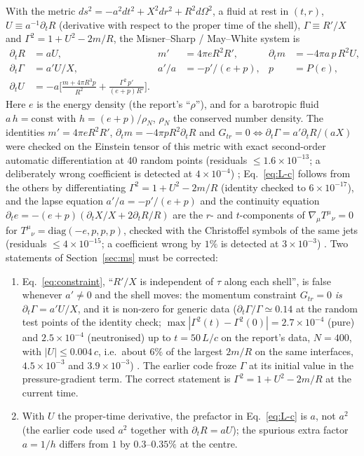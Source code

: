 \documentclass[11pt]{article}
\begin{document}
With the metric $ds^2=-a^2dt^2+X^2dr^2+R^2d\Omega^2$, a fluid at rest in $(t,r)$, $U\equiv a^{-1}\partial_tR$ (derivative with respect to the proper time of the shell), $\Gamma\equiv R'/X$ and $\Gamma^2=1+U^2-2m/R$, the Misner--Sharp \citep{MisnerSharp1964} / May--White \citep{MayWhite1966} system is
\begin{align}
\partial_t R&=aU, & m'&=4\pi e R^2R', & \partial_t m&=-4\pi a\,p\,R^2U, \label{eq:L-a}\\
\partial_t\Gamma&=a'U/X, & a'/a&=-p'/(e+p), & p&=P(e), \label{eq:L-b}\\
\partial_tU&=-a\Big[\frac{m+4\pi R^3p}{R^2}+\frac{\Gamma^2\,p'}{(e+p)R'}\Big]. \label{eq:L-c}
\end{align}
Here $e$ is the energy density (the report's ``$\rho$''), and for a barotropic fluid $a\,h=\mathrm{const}$ with $h=(e+p)/\rho_N$, $\rho_N$ the conserved number density.  The identities $m'=4\pi eR^2R'$, $\partial_tm=-4\pi pR^2\partial_tR$ and $G_{tr}=0\Leftrightarrow\partial_t\Gamma=a'\partial_tR/(aX)$ were checked on the Einstein tensor of this metric with exact second-order automatic differentiation at 40 random points (residuals $\le1.6\times10^{-13}$; a deliberately wrong coefficient is detected at $4\times10^{-4}$) \LP; Eq.~\eqref{eq:L-c} follows from the others by differentiating $\Gamma^2=1+U^2-2m/R$ (identity checked to $6\times10^{-17}$), and the lapse equation $a'/a=-p'/(e+p)$ and the continuity equation $\partial_te=-(e+p)(\partial_tX/X+2\partial_tR/R)$ are the $r$- and $t$-components of $\nabla_\mu T^{\mu}{}_{\nu}=0$ for $T^\mu{}_\nu=\mathrm{diag}(-e,p,p,p)$, checked with the Christoffel symbols of the same jets (residuals $\le4\times10^{-15}$; a coefficient wrong by $1\%$ is detected at $3\times10^{-3}$) \LP.  Two statements of Section~\ref{sec:ms} must be corrected:
\begin{enumerate}
\item Eq.~\eqref{eq:constraint}, ``$R'/X$ is independent of $\tau$ along each shell'', is false whenever $a'\neq0$ and the shell moves: the momentum constraint $G_{tr}=0$ \emph{is} $\partial_t\Gamma=a'U/X$, and it is non-zero for generic data ($\partial_t\Gamma/\Gamma\simeq0.14$ at the random test points of the identity check; $\max|\Gamma^2(t)-\Gamma^2(0)|=2.7\times10^{-4}$ (pure) and $2.5\times10^{-4}$ (neutronised) up to $t=50\,L/c$ on the report's data, $N=400$, with $|U|\le0.004\,c$, i.e.\ about $6\%$ of the largest $2m/R$ on the same interfaces, $4.5\times10^{-3}$ and $3.9\times10^{-3}$) \LP.  The earlier code froze $\Gamma$ at its initial value in the pressure-gradient term.  The correct statement is $\Gamma^2=1+U^2-2m/R$ at the current time.
\item With $U$ the proper-time derivative, the prefactor in Eq.~\eqref{eq:L-c} is $a$, not $a^2$ (the earlier code used $a^2$ together with $\partial_tR=aU$); the spurious extra factor $a=1/h$ differs from $1$ by $0.3$--$0.35\%$ at the centre.
\end{enumerate}
\end{document}
